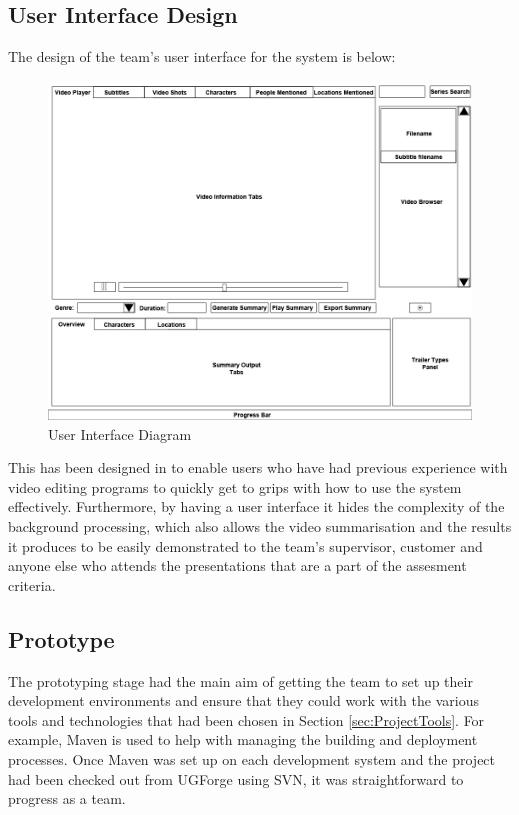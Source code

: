 \subsection{User Interface Design}
\label{sec:UIDesign}
The design of the team's user interface for the system is below:
\begin{figure}[h1]
\begin{center}
\includegraphics[trim = 0mm 0mm 0mm 0mm, clip, scale=0.43]{Images/user_interface_design.jpg}
\end{center}
\caption{User Interface Diagram}
\end{figure}

This has been designed in to enable users who have had previous experience with video editing programs to quickly get to grips with 
how to use the system effectively. Furthermore, by having a user interface it hides the complexity of the background processing, which also allows the video summarisation and the results it produces to be easily demonstrated to the team's supervisor, 
customer and anyone else who attends the presentations that are a part of the assesment criteria.

\newpage
\subsection{Prototype}
The prototyping stage had the main aim of getting the team to set up their development environments and ensure that they could work with the 
various tools and technologies that had been chosen in Section \ref{sec:ProjectTools}. For example, Maven \cite{citeMaven} is used to help 
with managing the building and deployment processes. Once Maven was set up on each development system and the project had been 
checked out from UGForge using SVN, it was straightforward to progress as a team. 

